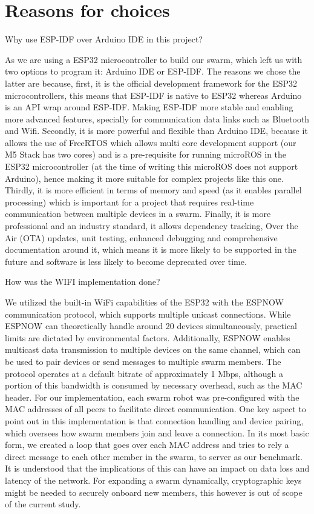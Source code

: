 \documentclass{report}
\begin{document}
\section{Reasons for choices}
Why use ESP-IDF over Arduino IDE in this project? \cite{esp-boards_esp-idf_nodate}\cite{expressif_freertos_nodate}

As we are using a ESP32 microcontroller to build our swarm, which left us with two options to program it: Arduino IDE or ESP-IDF. The reasons we chose the latter are because, first, it is the official development framework for the ESP32 microcontrollers, this means that ESP-IDF is native to ESP32 whereas Arduino is an API wrap around ESP-IDF. Making ESP-IDF more stable and enabling more advanced features, specially for communication data links such as Bluetooth and Wifi. Secondly, it is more powerful and flexible than Arduino IDE, because it allows the use of FreeRTOS which allows multi core development support (our M5 Stack has two cores) and is a pre-requisite for running microROS in the ESP32 microcontroller (at the time of writing this microROS does not support Arduino), hence making it more suitable for complex projects like this one. Thirdly, it is more efficient in terms of memory and speed (as it enables parallel processing) which is important for a project that requires real-time communication between multiple devices in a swarm. Finally, it is more professional and an industry standard, it allows dependency tracking, Over the Air (OTA) updates, unit testing, enhanced debugging and comprehensive documentation around it, which means it is more likely to be supported in the future and software is less likely to become deprecated over time.

How was the WIFI implementation done?

We utilized the built-in WiFi capabilities of the ESP32 with the ESPNOW communication protocol, which supports multiple unicast connections. While ESPNOW can theoretically handle around 20 devices simultaneously, practical limits are dictated by environmental factors. Additionally, ESPNOW enables multicast data transmission to multiple devices on the same channel, which can be used to pair devices or send messages to multiple swarm members. The protocol operates at a default bitrate of approximately 1 Mbps, although a portion of this bandwidth is consumed by necessary overhead, such as the MAC header. For our implementation, each swarm robot was pre-configured with the MAC addresses of all peers to facilitate direct communication. %
One key aspect to point out in this implementation is that connection handling and device pairing, which oversees how swarm members join and leave a connection. In its most basic form, we created a loop that goes over each MAC address and tries to rely a direct message to each other member in the swarm, to server as our benchmark. It is understood that the implications of this can have an impact on data loss and latency of the network.
For expanding a swarm dynamically, cryptographic keys might be needed to securely onboard new members, this however is out of scope of the current study.
\end{document}
